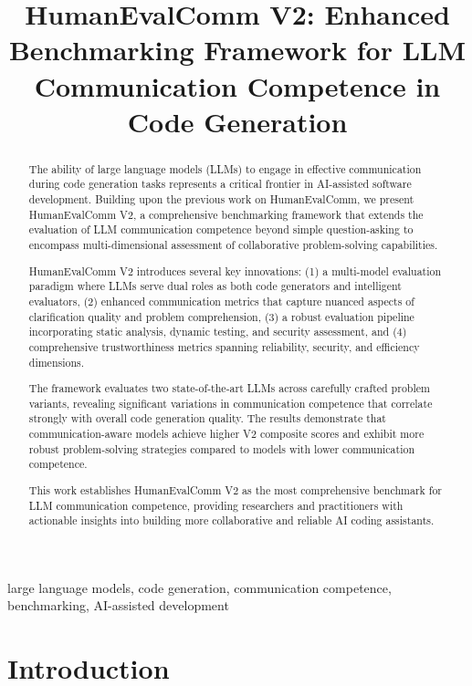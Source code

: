 \documentclass[conference]{IEEEtran}
\title{HumanEvalComm V2: Enhanced Benchmarking Framework for LLM Communication Competence in Code Generation}
\begin{document}
\maketitle

\begin{abstract}
The ability of large language models (LLMs) to engage in effective communication during code generation tasks represents a critical frontier in AI-assisted software development. Building upon the previous work on HumanEvalComm, we present HumanEvalComm V2, a comprehensive benchmarking framework that extends the evaluation of LLM communication competence beyond simple question-asking to encompass multi-dimensional assessment of collaborative problem-solving capabilities.

HumanEvalComm V2 introduces several key innovations: (1) a multi-model evaluation paradigm where LLMs serve dual roles as both code generators and intelligent evaluators, (2) enhanced communication metrics that capture nuanced aspects of clarification quality and problem comprehension, (3) a robust evaluation pipeline incorporating static analysis, dynamic testing, and security assessment, and (4) comprehensive trustworthiness metrics spanning reliability, security, and efficiency dimensions.

The framework evaluates two state-of-the-art LLMs across carefully crafted problem variants, revealing significant variations in communication competence that correlate strongly with overall code generation quality. The results demonstrate that communication-aware models achieve higher V2 composite scores and exhibit more robust problem-solving strategies compared to models with lower communication competence.

This work establishes HumanEvalComm V2 as the most comprehensive benchmark for LLM communication competence, providing researchers and practitioners with actionable insights into building more collaborative and reliable AI coding assistants.
\end{abstract}

\begin{IEEEkeywords}
large language models, code generation, communication competence, benchmarking, AI-assisted development
\end{IEEEkeywords}

\section{Introduction}
\end{document}
